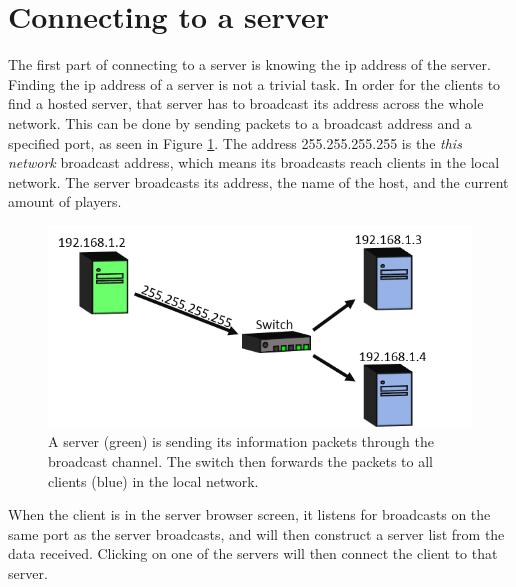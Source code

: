 \section{Connecting to a server}
The first part of connecting to a server is knowing the ip address of the server.
Finding the ip address of a server is not a trivial task.
In order for the clients to find a hosted server, that server has to broadcast its address across the whole network.
This can be done by sending packets to a broadcast address and a specified port, as seen in Figure \ref{fig:broadcast}.
The address 255.255.255.255 is the \textit{this network} broadcast address, which means its broadcasts reach clients in the local network.
The server broadcasts its address, the name of the host, and the current amount of players.

\begin{figure}[H]
\centering
\includegraphics[scale=1]{figures/network/broadcast}
\caption{A server (green) is sending its information packets through the broadcast channel. The switch then forwards the packets to all clients (blue) in the local network.}
\label{fig:broadcast}
\end{figure}

When the client is in the server browser screen, it listens for broadcasts on the same port as the server broadcasts, and will then construct a server list from the data received.
Clicking on one of the servers will then connect the client to that server.